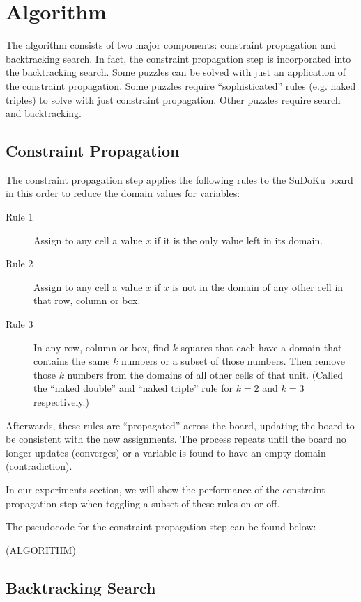\section{Algorithm}\label{sec:alg}

The algorithm consists of two major components: constraint propagation and backtracking search. In fact, the constraint propagation step is incorporated into the backtracking search. Some puzzles can be solved with just an application of the constraint propagation. Some puzzles require ``sophisticated'' rules (e.g. naked triples) to solve with just constraint propagation. Other puzzles require search and backtracking.

\subsection{Constraint Propagation}

The constraint propagation step applies the following rules to the SuDoKu board in this order to reduce the domain values for variables:

\begin{description}
	\item[Rule 1] Assign to any cell a value $x$ if it is the only value left in its domain.
	\item[Rule 2] Assign to any cell a value $x$ if $x$ is not in the domain of any other cell in that row, column or box.
	\item[Rule 3] In any row, column or box, find $k$ squares that each have a domain that contains the same $k$ numbers or a subset of those numbers. Then remove those $k$ numbers from the domains of all other cells of that unit. (Called the ``naked double'' and ``naked triple'' rule for $k=2$ and $k=3$ respectively.)
\end{description}

Afterwards, these rules are ``propagated'' across the board, updating the board to be consistent with the new assignments. The process repeats until the board no longer updates (converges) or a variable is found to have an empty domain (contradiction).

In our experiments section, we will show the performance of the constraint propagation step when toggling a subset of these rules on or off.

The pseudocode for the constraint propagation step can be found below:

(ALGORITHM)

\subsection{Backtracking Search}

